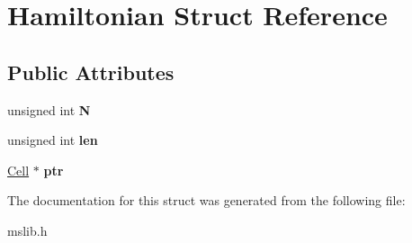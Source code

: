 \hypertarget{structHamiltonian}{\section{Hamiltonian Struct Reference}
\label{structHamiltonian}
}
\subsection*{Public Attributes}
\begin{DoxyCompactItemize}
\item 
\hypertarget{structHamiltonian_a3cae9634a97ff7ae85cd649df9e16846}{unsigned int {\bfseries N}}\label{structHamiltonian_a3cae9634a97ff7ae85cd649df9e16846}

\item 
\hypertarget{structHamiltonian_a66d7c87489a666261f0ea6a2af71a25c}{unsigned int {\bfseries len}}\label{structHamiltonian_a66d7c87489a666261f0ea6a2af71a25c}

\item 
\hypertarget{structHamiltonian_a93bb00c7e52a408154aaace965a05623}{\hyperlink{structCell}{Cell} $\ast$ {\bfseries ptr}}\label{structHamiltonian_a93bb00c7e52a408154aaace965a05623}

\end{DoxyCompactItemize}


The documentation for this struct was generated from the following file\-:\begin{DoxyCompactItemize}
\item 
mslib.\-h\end{DoxyCompactItemize}
